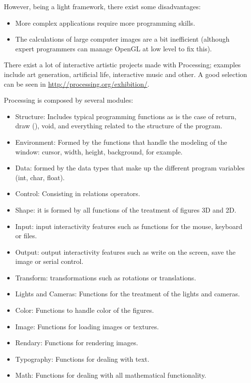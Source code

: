 \documentclass[conference]{IEEEtran}
\begin{document}
However, being a light framework, there exist some disadvantages:
\begin{itemize}
\item More complex applications require more programming skills.
\item The calculations of large computer images are a bit inefficient (although expert programmers can manage OpenGL at low level to fix this).
\end{itemize}

There exist a lot of interactive artistic projects made with Processing; examples include art generation, artificial life, interactive music and other. A good selection can be seen in \url{http://processing.org/exhibition/}.

Processing is composed by several modules:

\begin{itemize}
\item Structure: Includes typical programming functions as is the case of return, draw (), void, and everything related to the structure of the program.
\item Environment: Formed by the functions that handle the modeling of the window: cursor, width, height, background, for example.
\item Data: formed by the data types that make up the different program variables (int, char, float).
\item Control: Consisting in relations operators.
\item Shape: it is formed by all functions of the treatment of figures 3D and 2D.
\item Input: input interactivity features such as functions for the mouse, keyboard or files.
\item Output: output interactivity features such as write on the screen, save the image or serial control.
\item Transform: transformations such as rotations or translations.
\item Lights and Cameras: Functions for the treatment of the lights and cameras.
\item Color: Functions to handle color of the figures.
\item Image: Functions for loading images or textures.
\item Rendary: Functions for rendering images.
\item Typography: Functions for dealing with text.
\item Math: Functions for dealing with all mathematical functionality.
\end{itemize}
\end{document}
